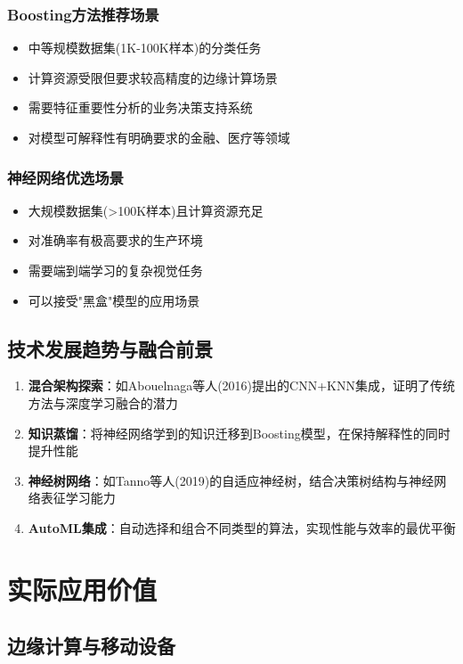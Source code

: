 \documentclass[UTF8]{report}
\theoremstyle{MyLineTheoremStyle} %
\theoremstyle{MyBlockTheoremStyle} %
\theoremstyle{MySubsubsectionStyle} %
\begin{document}
\subsubsection{Boosting方法推荐场景}
\begin{itemize}
    \item 中等规模数据集(1K-100K样本)的分类任务
    \item 计算资源受限但要求较高精度的边缘计算场景
    \item 需要特征重要性分析的业务决策支持系统
    \item 对模型可解释性有明确要求的金融、医疗等领域
\end{itemize}

\subsubsection{神经网络优选场景}
\begin{itemize}
    \item 大规模数据集(>100K样本)且计算资源充足
    \item 对准确率有极高要求的生产环境
    \item 需要端到端学习的复杂视觉任务
    \item 可以接受"黑盒"模型的应用场景
\end{itemize}

\subsection{技术发展趋势与融合前景}
\begin{enumerate}
    \item \textbf{混合架构探索}：如Abouelnaga等人(2016)提出的CNN+KNN集成，证明了传统方法与深度学习融合的潜力
    \item \textbf{知识蒸馏}：将神经网络学到的知识迁移到Boosting模型，在保持解释性的同时提升性能
    \item \textbf{神经树网络}：如Tanno等人(2019)的自适应神经树，结合决策树结构与神经网络表征学习能力
    \item \textbf{AutoML集成}：自动选择和组合不同类型的算法，实现性能与效率的最优平衡
\end{enumerate}

\section{实际应用价值}
\subsection{边缘计算与移动设备}
\end{document}

